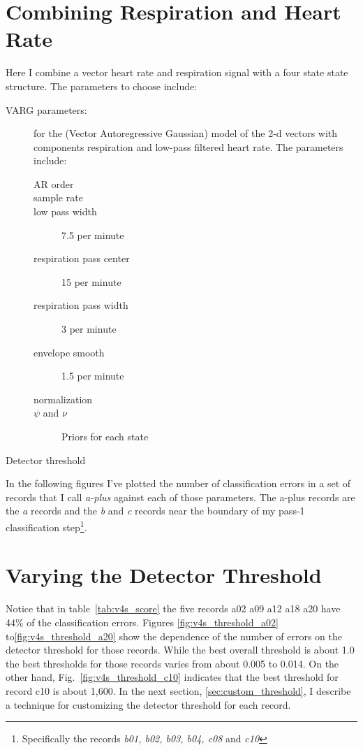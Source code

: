 \documentclass[12pt]{article}
\begin{document}
\section{Combining Respiration and Heart Rate}
\label{sec:combination}

Here I combine a vector heart rate and respiration signal with a four
state state structure.  The parameters to choose
include:
\begin{description}
\item[VARG parameters:] for the (Vector Autoregressive Gaussian) model
  of the 2-d vectors with components respiration and low-pass filtered
  heart rate.  The parameters include:
  \begin{description}
  \item[AR order] %
  \item[sample rate] %
  \item[low pass width] 7.5 per minute %
  \item[respiration pass center] 15 per minute %
  \item[respiration pass width] 3 per minute %
  \item[envelope smooth] 1.5 per minute %
  \item[normalization] 
  \item[$\psi$ and $\nu$] Priors for each state
  \end{description}
\item[Detector threshold]
\end{description}
In the following figures I've plotted the number of classification
errors in a set of records that I call \emph{a-plus} against each of
those parameters.  The a-plus records are the \emph{a} records and the
\emph{b} and \emph{c} records near the boundary of my pass-1
classification step\footnote{Specifically the records \emph{b01, b02,
    b03, b04, c08} and \emph{c10}}.


\clearpage %
\section{Varying the Detector Threshold}
\label{sec:threshold}

Notice that in table~\ref{tab:v4s_score} the five records a02 a09 a12
a18 a20 have 44\% of the classification errors.  Figures
\ref{fig:v4s_threshold_a02} to\ref{fig:v4s_threshold_a20} show the
dependence of the number of errors on the detector threshold for
those records.  While the best overall threshold is about 1.0 the best
thresholds for those records varies from about 0.005 to 0.014.  On the
other hand, Fig.~\ref{fig:v4s_threshold_c10} indicates that the best
threshold for record c10 is about 1,600.  In the next section,
\ref{sec:custom_threshold}, I describe a technique for customizing the
detector threshold for each record.
\end{document}

